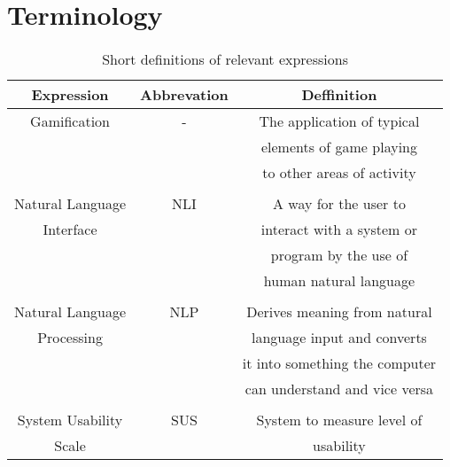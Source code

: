 \section{Terminology}

\begin{table}[ht]
  \centering
  \begin{tabular}{ccc}
    \toprule
    Expression & Abbrevation & Deffinition\\
    \midrule
    Gamification & - & The application of typical\\
    & & elements of game playing\\
    & & to other areas of activity \\
    \\
    Natural Language & NLI & A way for the user to\\
    Interface & & interact with a system or\\ 
    & & program by the use of\\
    & & human natural language\\
    \\
    Natural Language & NLP & Derives meaning from natural\\
    Processing & & language input and converts\\
    & & it into something the computer\\
    & & can understand and vice versa\\
    \\
    System Usability & SUS & System to measure level of\\
    Scale & &  usability\\
    \bottomrule
  \end{tabular}
  \caption{Short definitions of relevant expressions}\label{termin}
\end{table}